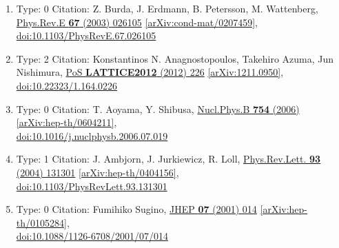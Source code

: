 \documentclass[a4paper,10pt]{article}
\begin{document}
\begin{enumerate}
\begin{enumerate}
  \item Type: 0 Citation: Z. Burda, J. Erdmann, B. Petersson, M. Wattenberg, \href{https://www.doi.org/10.1103/PhysRevE.67.026105}{Phys.Rev.E {\bf 67} (2003) 026105}  \href{https://arxiv.org/abs/cond-mat/0207459}{[arXiv:cond-mat/0207459]},\\\href{https://www.doi.org/10.1103/PhysRevE.67.026105}{doi:10.1103/PhysRevE.67.026105}
  \item Type: 2 Citation: Konstantinos N. Anagnostopoulos, Takehiro Azuma, Jun Nishimura, \href{https://www.doi.org/10.22323/1.164.0226}{PoS {\bf LATTICE2012} (2012) 226}  \href{https://arxiv.org/abs/1211.0950}{[arXiv:1211.0950]},\\\href{https://www.doi.org/10.22323/1.164.0226}{doi:10.22323/1.164.0226}
  \item Type: 0 Citation: T. Aoyama, Y. Shibusa, \href{https://www.doi.org/10.1016/j.nuclphysb.2006.07.019}{Nucl.Phys.B {\bf 754} (2006) }  \href{https://arxiv.org/abs/hep-th/0604211}{[arXiv:hep-th/0604211]},\\\href{https://www.doi.org/10.1016/j.nuclphysb.2006.07.019}{doi:10.1016/j.nuclphysb.2006.07.019}
  \item Type: 1 Citation: J. Ambjorn, J. Jurkiewicz, R. Loll, \href{https://www.doi.org/10.1103/PhysRevLett.93.131301}{Phys.Rev.Lett. {\bf 93} (2004) 131301}  \href{https://arxiv.org/abs/hep-th/0404156}{[arXiv:hep-th/0404156]},\\\href{https://www.doi.org/10.1103/PhysRevLett.93.131301}{doi:10.1103/PhysRevLett.93.131301}
  \item Type: 0 Citation: Fumihiko Sugino, \href{https://www.doi.org/10.1088/1126-6708/2001/07/014}{JHEP {\bf 07} (2001) 014}  \href{https://arxiv.org/abs/hep-th/0105284}{[arXiv:hep-th/0105284]},\\\href{https://www.doi.org/10.1088/1126-6708/2001/07/014}{doi:10.1088/1126-6708/2001/07/014}

\end{enumerate}
\end{enumerate}
\end{document}

